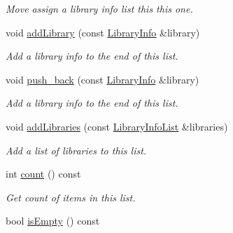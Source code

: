 \begin{DoxyCompactItemize}
\begin{DoxyCompactList}\small\item\em Move assign a library info list this this one. \end{DoxyCompactList}\item 
void \hyperlink{class_mdt_1_1_deploy_utils_1_1_library_info_list_a2fd0bcb2c98ed5a9587e54d6496dac14}{add\+Library} (const \hyperlink{class_mdt_1_1_deploy_utils_1_1_library_info}{Library\+Info} \&library)
\begin{DoxyCompactList}\small\item\em Add a library info to the end of this list. \end{DoxyCompactList}\item 
void \hyperlink{class_mdt_1_1_deploy_utils_1_1_library_info_list_ab2b6f563946dbd690155c7b46e5b94c0}{push\+\_\+back} (const \hyperlink{class_mdt_1_1_deploy_utils_1_1_library_info}{Library\+Info} \&library)
\begin{DoxyCompactList}\small\item\em Add a library info to the end of this list. \end{DoxyCompactList}\item 
void \hyperlink{class_mdt_1_1_deploy_utils_1_1_library_info_list_a08bddbe73a73a1c3b11c1d7633d4ca5c}{add\+Libraries} (const \hyperlink{class_mdt_1_1_deploy_utils_1_1_library_info_list}{Library\+Info\+List} \&libraries)
\begin{DoxyCompactList}\small\item\em Add a list of libraries to this list. \end{DoxyCompactList}\item 
int \hyperlink{class_mdt_1_1_deploy_utils_1_1_library_info_list_a4a43a85999332ac32f738342fc8d832a}{count} () const \hypertarget{class_mdt_1_1_deploy_utils_1_1_library_info_list_a4a43a85999332ac32f738342fc8d832a}{}\label{class_mdt_1_1_deploy_utils_1_1_library_info_list_a4a43a85999332ac32f738342fc8d832a}

\begin{DoxyCompactList}\small\item\em Get count of items in this list. \end{DoxyCompactList}\item 
bool \hyperlink{class_mdt_1_1_deploy_utils_1_1_library_info_list_a3868a02a4c0d4836f9c90fabde0213db}{is\+Empty} () const \hypertarget{class_mdt_1_1_deploy_utils_1_1_library_info_list_a3868a02a4c0d4836f9c90fabde0213db}{}\label{class_mdt_1_1_deploy_utils_1_1_library_info_list_a3868a02a4c0d4836f9c90fabde0213db}


\end{DoxyCompactItemize}
